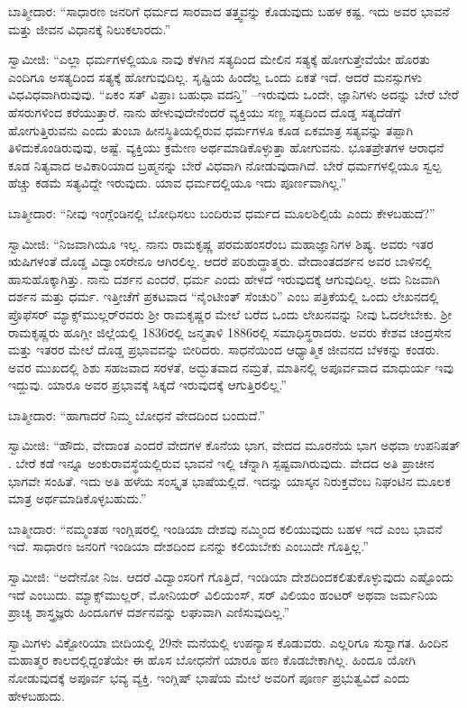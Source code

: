 ಬಾತ್ಮೀದಾರ: “ಸಾಧಾರಣ ಜನರಿಗೆ ಧರ್ಮದ ಸಾರವಾದ ತತ್ತ್ವವನ್ನು ಕೊಡುವುದು ಬಹಳ ಕಷ್ಟ. ಇದು ಅವರ ಭಾವನೆ ಮತ್ತು ಜೀವನ ವಿಧಾನಕ್ಕೆ ನಿಲುಕಲಾರದು.”

ಸ್ವಾಮೀಜಿ: “ಎಲ್ಲಾ ಧರ್ಮಗಳಲ್ಲಿಯೂ ನಾವು ಕೆಳಗಿನ ಸತ್ಯದಿಂದ ಮೇಲಿನ ಸತ್ಯಕ್ಕೆ ಹೋಗುತ್ತೇವೆಯೇ ಹೊರತು ಎಂದಿಗೂ ಅಸತ್ಯದಿಂದ ಸತ್ಯಕ್ಕೆ ಹೋಗುವುದಿಲ್ಲ. ಸೃಷ್ಟಿಯ ಹಿಂದೆಲ್ಲ ಒಂದು ಏಕತೆ ಇದೆ. ಆದರೆ ಮನಸ್ಸುಗಳು ವಿಧವಿಧವಾಗಿರುವುವು. “ಏಕಂ ಸತ್​ ವಿಪ್ರಾಃ ಬಹುಧಾ ವದನ್ತಿ” –ಇರುವುದು ಒಂದೇ, ಜ್ಞಾನಿಗಳು ಅದನ್ನು ಬೇರೆ ಬೇರೆ ಹೆಸರುಗಳಿಂದ ಕರೆಯುತ್ತಾರೆ. ನಾನು ಹೇಳುವುದೇನೆಂದರೆ ವ್ಯಕ್ತಿಯು ಸಣ್ಣ ಸತ್ಯದಿಂದ ದೊಡ್ಡ ಸತ್ಯದೆಡೆಗೆ ಹೋಗುತ್ತಿರುವನು ಎಂದು ತುಂಬಾ ಹೀನಸ್ಥಿತಿಯಲ್ಲಿರುವ ಧರ್ಮಗಳೂ ಕೂಡ ಏಕಮಾತ್ರ ಸತ್ಯವನ್ನು ತಪ್ಪಾಗಿ ತಿಳಿದುಕೊಂಡಿರುವುವು, ಅಷ್ಟೆ. ವ್ಯಕ್ತಿಯು ಕ್ರಮೇಣ ಅರ್ಥಮಾಡಿಕೊಳ್ಳುತ್ತಾ ಹೋಗುವನು. ಭೂತಪ್ರೇತಗಳ ಆರಾಧನೆ ಕೂಡ ನಿತ್ಯವಾದ ಅವಿಕಾರಿಯಾದ ಬ್ರಹ್ಮನನ್ನು ಬೇರೆ ವಿಧವಾಗಿ ನೋಡುವುದಾಗಿದೆ. ಬೇರೆ ಧರ್ಮಗಳಲ್ಲಿಯೂ ಸ್ವಲ್ಪ ಹೆಚ್ಚು ಕಡಮೆ ಸತ್ಯವಿದ್ದೇ ಇರುವುದು. ಯಾವ ಧರ್ಮದಲ್ಲಿಯೂ ಇದು ಪೂರ್ಣವಾಗಿಲ್ಲ.”

ಬಾತ್ಮೀದಾರ: “ನೀವು ಇಂಗ್ಲೆಂಡಿನಲ್ಲಿ ಬೋಧಿಸಲು ಬಂದಿರುವ ಧರ್ಮದ ಮೂಲಶಿಲ್ಪಿಯೆ ಎಂದು ಕೇಳಬಹುದೆ?”

ಸ್ವಾಮೀಜಿ: “ನಿಜವಾಗಿಯೂ ಇಲ್ಲ. ನಾನು ರಾಮಕೃಷ್ಣ ಪರಮಹಂಸರೆಂಬ ಮಹಾಜ್ಞಾನಿಗಳ ಶಿಷ್ಯ. ಅವರು ಇತರ ಋಷಿಗಳಂತೆ ದೊಡ್ಡ ವಿದ್ವಾಂಸರೇನೂ ಆಗಿರಲಿಲ್ಲ. ಆದರೆ ಪರಿಶುದ್ಧಾತ್ಮರು. ವೇದಾಂತದರ್ಶನ ಅವರ ಬಾಳಿನಲ್ಲಿ ಹಾಸುಹೊಕ್ಕಾಗಿತ್ತು. ನಾನು ದರ್ಶನ ಎಂದರೆ, ಧರ್ಮ ಎಂದು ಹೇಳದೆ ಇರುವುದಕ್ಕೆ ಆಗುವುದಿಲ್ಲ. ಅದು ನಿಜವಾಗಿ ದರ್ಶನ ಮತ್ತು ಧರ್ಮ. ಇತ್ತೀಚೆಗೆ ಪ್ರಕಟವಾದ “ನೈಂಟೀಂತ್​ ಸೆಂಚುರಿ” ಎಂಬ ಪತ್ರಿಕೆಯಲ್ಲಿ ಒಂದು ಲೇಖನದಲ್ಲಿ ಪ್ರೊಫೆಸರ್​ ಮ್ಯಾಕ್ಸ್​ಮುಲ್ಲರ್​ರವರು ಶ‍್ರೀ ರಾಮಕೃಷ್ಣರ ಮೇಲೆ ಬರೆದ ಒಂದು ಲೇಖನವನ್ನು ನೀವು ಓದಲೇಬೇಕು. ಶ‍್ರೀ ರಾಮಕೃಷ್ಣರು ಹೂಗ್ಲೀ ಜಿಲ್ಲೆಯಲ್ಲಿ 1836ರಲ್ಲಿ ಜನ್ಮತಾಳಿ 1886ರಲ್ಲಿ ಸಮಾಧಿಸ್ಥರಾದರು. ಅವರು ಕೇಶವ ಚಂದ್ರಸೇನ ಮತ್ತು ಇತರರ ಮೇಲೆ ದೊಡ್ಡ ಪ್ರಭಾವವನ್ನು ಬೀರಿದರು. ಸಾಧನೆಯಿಂದ ಆಧ್ಯಾತ್ಮಿಕ ಜೀವನದ ಬೆಳಕನ್ನು ಕಂಡರು. ಅವರ ಮುಖದಲ್ಲಿ ಶಿಶು ಸಹಜವಾದ ಸರಳತೆ, ಅದ್ಭುತವಾದ ನಮ್ರತೆ, ಮಾತಿನಲ್ಲಿ ಅಪೂರ್ವವಾದ ಮಾಧುರ್ಯ ಇವು ಇದ್ದುವು. ಯಾರೂ ಅವರ ಪ್ರಭಾವಕ್ಕೆ ಸಿಕ್ಕದೆ ಇರುವುದಕ್ಕೆ ಆಗುತ್ತಿರಲಿಲ್ಲ.”

ಬಾತ್ಮೀದಾರ: “ಹಾಗಾದರೆ ನಿಮ್ಮ ಬೋಧನೆ ವೇದದಿಂದ ಬಂದುದೆ.”

ಸ್ವಾಮೀಜಿ: “ಹೌದು, ವೇದಾಂತ ಎಂದರೆ ವೇದಗಳ ಕೊನೆಯ ಭಾಗ, ವೇದದ ಮೂರನೆಯ ಭಾಗ ಅಥವಾ ಉಪನಿಷತ್​. ಬೇರೆ ಕಡೆ ಇನ್ನೂ ಅಂಕುರಾವಸ್ಥೆಯಲ್ಲಿರುವ ಭಾವನೆ ಇಲ್ಲಿ ಚೆನ್ನಾಗಿ ಸ್ಪಷ್ಟವಾಗಿರುವುದು. ವೇದದ ಅತಿ ಪ್ರಾಚೀನ ಭಾಗವೇ ಸಂಹಿತೆ. ಇದು ಅತಿ ಹಳೆಯ ಸಂಸ್ಕೃತ ಭಾಷೆಯಲ್ಲಿದೆ. ಇದನ್ನು ಯಾಸ್ಕನ ನಿರುಕ್ತವೆಂಬ ನಿಘಂಟಿನ ಮೂಲಕ ಮಾತ್ರ ಅರ್ಥಮಾಡಿಕೊಳ್ಳಬಹುದು.”

ಬಾತ್ಮೀದಾರ: “ನಮ್ಮಂತಹ ಇಂಗ್ಲಿಷರಲ್ಲಿ ಇಂಡಿಯಾ ದೇಶವು ನಮ್ಮಿಂದ ಕಲಿಯುವುದು ಬಹಳ ಇದೆ ಎಂಬ ಭಾವನೆ ಇದೆ. ಸಾಧಾರಣ ಜನರಿಗೆ ಇಂಡಿಯಾ ದೇಶದಿಂದ ಏನನ್ನು ಕಲಿಯಬೇಕು ಎಂಬುದೇ ಗೊತ್ತಿಲ್ಲ.”

ಸ್ವಾಮೀಜಿ: “ಅದೇನೋ ನಿಜ. ಆದರೆ ವಿದ್ವಾಂಸರಿಗೆ ಗೊತ್ತಿದೆ, ಇಂಡಿಯಾ ದೇಶದಿಂದ\break ಕಲಿತುಕೊಳ್ಳುವುದು ಎಷ್ಟೊಂದು ಇದೆ ಎಂಬುದು. ಮ್ಯಾಕ್ಸ್​ಮುಲ್ಲರ್​, ಮೋನಿಯರ್​ ವಿಲಿಯಂಸ್​, ಸರ್​ ವಿಲಿಯಂ ಹಂಟರ್​ ಅಥವಾ ಜರ್ಮನಿಯ ಪ್ರಾಚ್ಯ ಶಾಸ್ತ್ರಜ್ಞರು ಹಿಂದೂಗಳ ದರ್ಶನವನ್ನು ಲಘುವಾಗಿ ಎಣಿಸುವುದಿಲ್ಲ.”

\delimiter

ಸ್ವಾಮಿಗಳು ವಿಕ್ಟೋರಿಯಾ ಬೀದಿಯಲ್ಲಿ 29ನೇ ಮನೆಯಲ್ಲಿ ಉಪನ್ಯಾಸ ಕೊಡುವರು. ಎಲ್ಲರಿಗೂ ಸುಸ್ವಾಗತ. ಹಿಂದಿನ ಮಹಾತ್ಮರ ಕಾಲದಲ್ಲಿದ್ದಂತೆಯೇ ಈ ಹೊಸ ಬೋಧನೆಗೆ ಯಾರೂ ಹಣ ಕೊಡಬೇಕಾಗಿಲ್ಲ. ಹಿಂದೂ ಯೋಗಿ ನೋಡುವುದಕ್ಕೆ ಅಪೂರ್ವ ಭವ್ಯ ವ್ಯಕ್ತಿ. ಇಂಗ್ಲಿಷ್​ ಭಾಷೆಯ ಮೇಲೆ ಅವರಿಗೆ ಪೂರ್ಣ ಪ್ರಭುತ್ವವಿದೆ ಎಂದು ಹೇಳಬಹುದು.

\newpage

